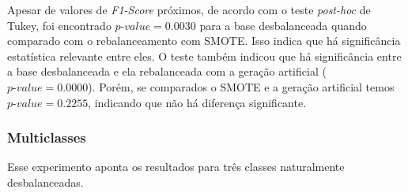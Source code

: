 

Apesar de valores de \textit{F1-Score} próximos, de acordo com o teste \textit{post-hoc} de Tukey, foi encontrado $\textit{p-value} = 0.0030$ para a base desbalanceada quando comparado com o rebalanceamento com SMOTE. Isso indica que há significância estatística relevante entre eles. O teste também indicou que há significância entre a base desbalanceada e ela rebalanceada com a geração artificial ($\textit{p-value} = 0.0000$). Porém, se comparados o SMOTE e a geração artificial temos $\textit{p-value} = 0.2255$, indicando que não há diferença significante.

\subsubsection{Multiclasses}
Esse experimento aponta os resultados para três classes naturalmente desbalanceadas.

